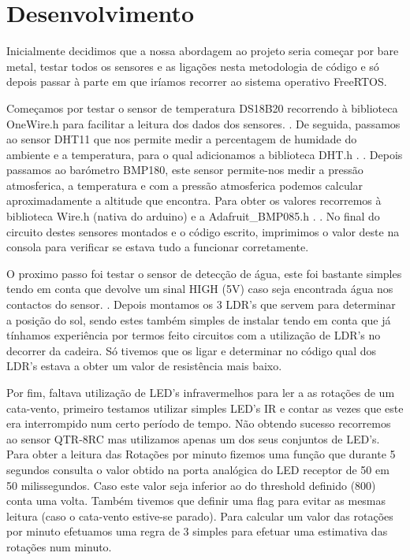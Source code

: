 \documentclass[11pt]{report}
\begin{document}
\chapter*{Desenvolvimento}

Inicialmente decidimos que a nossa abordagem ao projeto seria começar por bare metal, testar todos os sensores e as ligações nesta metodologia de código e só depois passar à parte em que iríamos recorrer ao sistema operativo FreeRTOS. \linebreak

Começamos por testar o sensor de temperatura DS18B20 recorrendo à biblioteca OneWire.h \cite{OneWire}  para facilitar a leitura dos dados dos sensores. \cite{WaterproofDS18B20} \cite{sparkfunDS18B20}. De seguida, passamos ao sensor DHT11 que nos permite medir a percentagem de humidade do ambiente e a temperatura, para o qual adicionamos a biblioteca DHT.h \cite{DHTadafruit}. \cite{DHT}. Depois passamos ao barómetro BMP180, este sensor permite-nos medir a pressão atmosferica, a temperatura e com a pressão atmosferica podemos calcular aproximadamente a altitude que encontra.  Para obter os valores recorremos à biblioteca  Wire.h  (nativa do arduino) e a  Adafruit\_BMP085.h \cite{bmpBiblio}. \cite{bmp}. No final do circuito destes sensores montados e o código escrito, imprimimos o valor deste na consola para verificar se estava tudo a funcionar corretamente. \linebreak

O proximo passo foi testar o sensor de detecção de água, este foi bastante simples tendo em conta que devolve um sinal HIGH (5V) caso seja encontrada água nos contactos do sensor. \cite{water}. Depois montamos os 3 LDR's que servem para determinar a posição do sol, sendo estes também simples de instalar tendo em conta que já tínhamos experiência por termos feito circuitos com a utilização de LDR's no decorrer da cadeira. Só tivemos que os ligar e determinar no código qual dos LDR's estava a obter um valor de resistência mais baixo. \linebreak

Por fim, faltava utilização de LED's infravermelhos para ler a as rotações de um cata-vento, primeiro testamos utilizar simples LED's IR e contar as vezes que este era interrompido num certo período de tempo. Não obtendo sucesso recorremos ao sensor QTR-8RC mas utilizamos apenas um dos seus conjuntos de LED's. Para obter a leitura das Rotações por minuto fizemos uma função que durante 5 segundos consulta o valor obtido na porta analógica do LED receptor de 50 em 50 milissegundos. Caso este valor seja inferior ao do threshold definido (800) conta uma volta. Também tivemos que definir uma flag para evitar as mesmas leitura (caso o cata-vento estive-se parado). Para calcular um valor das rotações por minuto efetuamos uma regra de 3 simples para efetuar uma estimativa das rotações num minuto. \pagebreak
\end{document}

